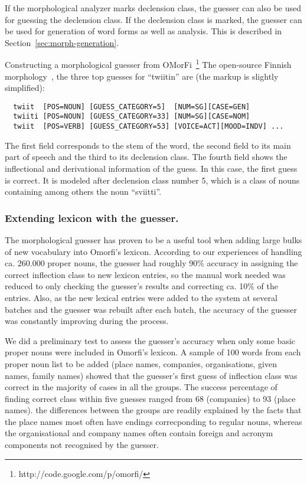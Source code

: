 \documentclass{llncs}
\begin{document}
If the morphological analyzer marks declension class, the guesser can
also be used for guessing the declension class. If the declension
class is marked, the guesser can be used for generation of word forms
as well as analysis. This is described in
Section~\ref{sec:morph-generation}.

Constructing a morphological guesser from
OMorFi~\footnote{http://code.google.com/p/omorfi/} The open-source
Finnish morphology~\cite{pirinen/2008}, the three top guesses for
``twiitin'' are (the markup is slightly simplified): \small
\begin{verbatim}
  twiit  [POS=NOUN] [GUESS_CATEGORY=5]  [NUM=SG][CASE=GEN]
  twiiti [POS=NOUN] [GUESS_CATEGORY=33] [NUM=SG][CASE=NOM]
  twiit  [POS=VERB] [GUESS_CATEGORY=53] [VOICE=ACT][MOOD=INDV] ...
\end{verbatim}
\normalsize
The first field corresponds to the stem of the word, the second field
to its main part of speech and the third to its declension class. The
fourth field shows the inflectional and derivational information of
the guess. In this case, the first guess is correct. It is modeled
after declension class number 5, which is a class of nouns containing
among others the noun ``sviitti''.

\subsubsection{Extending lexicon with the guesser.}

The morphological guesser has proven to be a useful tool when adding 
large bulks of new vocabulary into Omorfi's lexicon. According to our
experiences of handling ca. 260.000 proper nouns, the guesser had
roughly 90\% accuracy in assigning the correct inflection class to new
lexicon entries, so the manual work needed was reduced to only
checking the guesser's results and correcting ca. 10\% of the
entries. Also, as the new lexical entries were added to the system at
several batches and the guesser was rebuilt after each batch, the
accuracy of the guesser was constantly improving during the process.

We did a preliminary test to assess the guesser's accuracy when only
some basic proper nouns were included in Omorfi's lexicon. A sample of
100 words from each proper noun list to be added (place names,
companies, organisations, given names, family names) showed that the
guesser's first guess of inflection class was correct in the majority
of cases in all the groups. The success percentage of finding correct
class within five guesses ranged from 68 (companies) to 93 (place
names). the differences between the groups are readily explained by
the facts that the place names most often have endings correcponding
to regular nouns, whereas the organisational and company names often
contain foreign and acronym components not recognised by the guesser.
\end{document}
